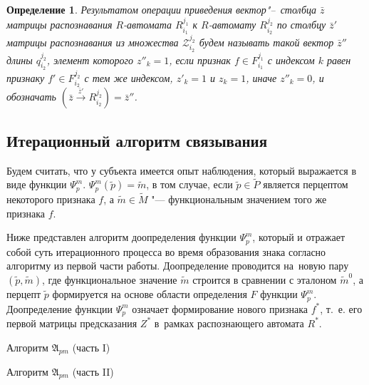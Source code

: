 \documentclass[a4paper, 12pt]{article}
\theoremstyle{plain}
\newtheorem{Def}{Определение}
\newcommand{\stretchsize}{2}
\renewcommand{\baselinestretch}{\stretchsize}
\begin{document}
	\begin{Def}
		Результатом операции приведения вектор"--~столбца $\bar z$ матрицы распознавания $R$-автомата $R_{i_1}^{j_1}$ к $R$-автомату $R_{i_2}^{j_2}$ по столбцу $\bar z'$ матрицы распознавания из множества  $\mathcal Z_{i_2}^{j_2}$ будем называть такой вектор $\bar z''$ длины $q_{i_2}^{j_2}$, элемент которого $z''_k=1$, если признак $f\in F_{i_1}^{j_1}$ с индексом $k$ равен признаку $f'\in F_{i_2}^{j_2}$ с тем же индексом, $z'_k=1$ и $z_k=1$, иначе $z''_k=0$, и обозначать $(\bar z\xrightarrow{\bar z'} R_{i_2}^{j_2})=\bar z''$.
	\end{Def}

	
	\subsection{Итерационный алгоритм связывания}
	Будем считать, что у субъекта имеется опыт наблюдения, который выражается в виде функции $\Psi_p^m$. $\Psi_p^m(\tilde p)=\tilde m$, в том случае, если $\tilde p\in\tilde P$ является перцептом некоторого признака $f$, а $\tilde m\in\tilde M$ "--- функциональным значением того же признака $f$.
	
	Ниже представлен алгоритм доопределения функции $\Psi_p^m$, который и отражает собой суть итерационного процесса во время образования знака согласно алгоритму из первой части работы. Доопределение проводится на~новую пару $(\tilde p,\tilde m)$, где функциональное значение $\tilde m$ строится в сравнении с эталоном $\tilde m^0$, а перцепт $\tilde p$ формируется на основе области определения $\hat F$ функции $\Psi_p^m$. Доопределение функции $\Psi_p^m$ означает формирование нового признака $f^*$, т.~е. его первой матрицы предсказания $Z^*$ в~рамках распознающего автомата $R^*$.

	\renewcommand{\baselinestretch}{1}				
	\begin{algorithm}[h]
		\caption{Алгоритм $\mathfrak{A}_{pm}$ (часть I)}
		\label{alg:cycle_pm_start}
		\begin{algorithmic}[1]
			
		\end{algorithmic}			
	\end{algorithm}
	\renewcommand{\baselinestretch}{\stretchsize}

	\renewcommand{\baselinestretch}{1}				
	\begin{algorithm}[h]
		\caption{Алгоритм $\mathfrak{A}_{pm}$ (часть II)}
		\label{alg:cycle_pm_end}
		\begin{algorithmic}[1]
			\algrestore{algst:store2}
			
		\end{algorithmic}		
	\end{algorithm}
	\renewcommand{\baselinestretch}{\stretchsize}
		
\end{document}
